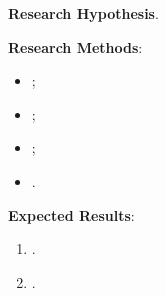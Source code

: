 \documentclass[
     english, %
    monochrome, %
]{VUMIFSEMasterThesis}
\begin{document}
\textbf{Research Hypothesis}.

\textbf{Research Methods}:
\begin{itemize}
\item ;
\item ;
\item ;
\item .
\end{itemize}

\textbf{Expected Results}:
\begin{enumerate}
\item .
\item .
\end{enumerate}






\printbibliography[heading=bibintoc]  %

\end{document}
